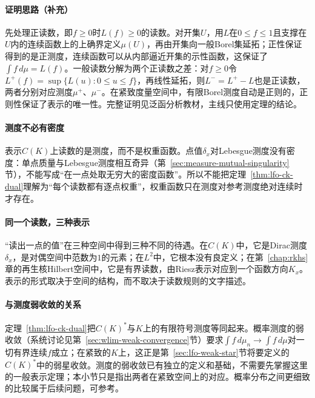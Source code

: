 \paragraph{证明思路（补充）}
先处理正读数，即$f\geq0$时$L(f)\geq0$的读数。对开集$U$，用$L$在$0\leq f\leq1$且支撑在$U$内的连续函数上的上确界定义$\mu(U)$，再由开集向一般Borel集延拓；正性保证得到的是正测度，连续函数可以从内部逼近开集的示性函数，这保证了$\int f\,d\mu=L(f)$。一般读数分解为两个正读数之差：对$f\geq0$令$L^+(f)=\sup\{L(u):0\leq u\leq f\}$，再线性延拓，则$L^-=L^+-L$也是正读数，两者分别对应测度$\mu^+$、$\mu^-$。在紧致度量空间中，有限Borel测度自动是正则的，正则性保证了表示的唯一性。完整证明见泛函分析教材，主线只使用定理的结论。

\paragraph{测度不必有密度}
表示$C(K)$上读数的是测度，而不是权重函数。点值$\delta_x$对Lebesgue测度没有密度：单点质量与Lebesgue测度相互奇异（第~\ref{sec:measure-mutual-singularity}节），不能写成“在一点处取无穷大的密度函数”。所以不能把定理~\ref{thm:lfo-ck-dual}理解为“每个读数都有逐点权重”，权重函数只在测度对参考测度绝对连续时才存在。

\paragraph{同一个读数，三种表示}
“读出一点的值”在三种空间中得到三种不同的待遇。在$C(K)$中，它是Dirac测度$\delta_x$，是对偶空间中范数为$1$的元素；在$L^2$中，它根本没有良定义；在第~\ref{chap:rkhs}章的再生核Hilbert空间中，它是有界读数，由Riesz表示对应到一个函数方向$K_x$。表示的形式取决于空间的结构，而不取决于读数规则的文字描述。

\paragraph{与测度弱收敛的关系}
定理~\ref{thm:lfo-ck-dual}把$C(K)^*$与$K$上的有限符号测度等同起来。概率测度的弱收敛（系统讨论见第~\ref{sec:wlim-weak-convergence}节）要求$\int f\,d\mu_n\to\int f\,d\mu$对一切有界连续$f$成立；在紧致的$K$上，这正是第~\ref{sec:lfo-weak-star}节将要定义的$C(K)^*$中的弱星收敛。测度的弱收敛已有独立的定义和基础，不需要先掌握这里的一般表示定理；本小节只是指出两者在紧致空间上的对应。概率分布之间更细致的比较属于后续问题，可参考。
